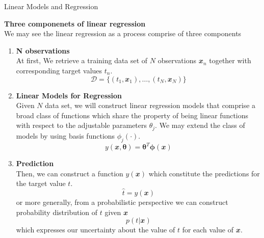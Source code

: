 \documentclass{bredelebeamer}
\begin{document}
\begin{frame}{Linear Models and Regression}
  \begin{justify}
    \textbf{Three componenets of linear regression} \\
    We may see the linear regression as a process
    comprise of three components

    \begin{enumerate}
      \item
      \textbf{N observations} \\
      At first, We retrieve a training data set of $N$ observations $\mathbfit{x}_n$
      together with corresponding target values $t_n$.
      \begin{equation}
        \mathcal{D} = \{(t_1, \mathbfit{x}_1), \ldots, (t_N,\mathbfit{x}_N)\}
      \end{equation}

      \item
      \textbf{Linear Models for Regression} \\
      Given $N$ data set, we will construct linear regression models that comprise
      a broad class of functions which share the property of being linear functions
      with respect to the adjustable parameters $\theta_j$. We may extend the class
      of models by using basis functions $\phi_j(\cdot)$.
      \begin{equation}
        y(\mathbfit{x}, \boldsymbol{\theta}) = \boldsymbol{\theta}^T \boldsymbol{\phi}(\mathbfit{x})
      \end{equation}

      \item
      \textbf{Prediction} \\
      Then, we can construct a function $y(\mathbfit{x})$  which constitute the
      predictions for the target value $t$.
      \begin{equation}
        \hat{t} = y(\mathbfit{x})
      \end{equation}
      or more generally, from a probabilistic perspective we can construct probability
      distribution of $t$ given $\mathbfit{x}$
      \begin{equation}
        p(t|\mathbfit{x})
      \end{equation}
      which expresses our uncertainty about the value of $t$ for each value of
      $\mathbfit{x}$.
    \end{enumerate}
  \end{justify}
\end{frame}
\end{document}
